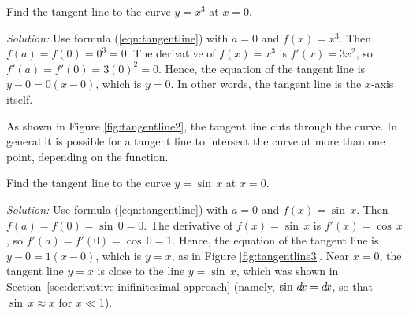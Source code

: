 \begin{exmp}\label{exmp:tangentline2}
 \piccaption[]{\label{fig:tangentline2}}
\noindent Find the tangent line to the curve $y = x^3$ at $x = 0$.\vspace{1mm}
\par\noindent\emph{Solution:} Use formula (\ref{eqn:tangentline}) with $a = 0$
and $f(x) = x^3$. Then $f(a) = f(0) = 0^3 = 0$. The derivative of $f(x) = x^3$
is $f'(x) = 3x^2$, so $f'(a) = f'(0) = 3(0)^2 = 0$. Hence, the equation of the
tangent line is ${y - 0 = 0(x - 0)}$, which is
$y = 0$. In other words, the tangent line is
the $x$-axis itself.\vspace{1mm}
\par\noindent As shown in Figure \ref{fig:tangentline2}, the tangent line cuts
through the curve. In general it is possible for a tangent line to intersect the
curve at more than one point, depending on the function.
\end{exmp}
\begin{exmp}\label{exmp:tangentline3}
 \piccaption[]{\label{fig:tangentline3}}
\noindent Find the tangent line to the curve $y = \sin\,x$ at $x = 0$.\vspace{1mm}
\par\noindent\emph{Solution:} Use formula (\ref{eqn:tangentline}) with $a = 0$
and $f(x) = \sin\,x$. Then $f(a) = f(0) = \sin\,0 = 0$. The derivative of
$f(x) = \sin\,x$ is $f'(x) = \cos\,x$, so $f'(a) = f'(0) = \cos\,0 = 1$. Hence,
the equation of the tangent line is ${y - 0 = 1(x - 0)}$, which is
$y = x$, as in Figure \ref{fig:tangentline3}.
Near $x = 0$, the tangent line $y = x$ is close to the line $y = \sin\,x$, which
was shown in Section~\ref{sec:derivative-inifinitesimal-approach} (namely, $\sin\,d\!x = d\!x$, so that $\sin\,x \approx x$
for $x \ll 1$).
\end{exmp}
